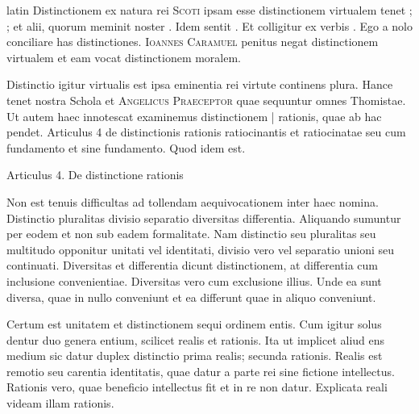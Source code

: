 \begin{otherlanguage*}{latin}
\pstart
Distinctionem ex natura rei \textsc{Scoti} ipsam esse distinctionem virtualem tenet ; ; et alii, quorum meminit noster . Idem sentit . Et colligitur ex verbis . Ego a nolo conciliare has distinctiones. \textsc{Ioannes Caramuel} penitus negat distinctionem virtualem et eam vocat distinctionem moralem. 
\pend

\pstart
Distinctio igitur virtualis est ipsa eminentia rei virtute continens plura. Hance tenet nostra Schola et \textsc{Angelicus Praeceptor} quae sequuntur omnes Thomistae. Ut autem haec innotescat examinemus distinctionem \textnormal{|} rationis, quae ab hac pendet. Articulus 4 de distinctionis rationis ratiocinantis et ratiocinatae seu cum fundamento et sine fundamento. Quod idem est. 
\pend

\pstart
{}
\pend

\pstart
\noindent%
Articulus 4. De distinctione rationis 
\pend

\pstart
Non est tenuis difficultas ad tollendam aequivocationem inter haec nomina. Distinctio pluralitas divisio separatio diversitas differentia. Aliquando sumuntur per eodem et non sub eadem formalitate. Nam distinctio seu pluralitas seu multitudo opponitur unitati vel identitati, divisio vero vel separatio unioni seu continuati. Diversitas et differentia dicunt distinctionem, at differentia cum inclusione convenientiae. Diversitas vero cum exclusione illius. Unde ea sunt diversa, quae in nullo conveniunt et ea differunt quae in aliquo conveniunt. 
\pend

\pstart
Certum est unitatem et distinctionem sequi ordinem entis. Cum igitur solus dentur duo genera entium, scilicet realis et rationis. Ita ut implicet aliud ens medium sic datur duplex distinctio prima realis; secunda rationis. Realis est remotio seu carentia identitatis, quae datur a parte rei sine fictione intellectus. Rationis vero, quae beneficio intellectus fit et in re non datur. Explicata reali videam illam rationis. 
\pend


\end{otherlanguage*}
